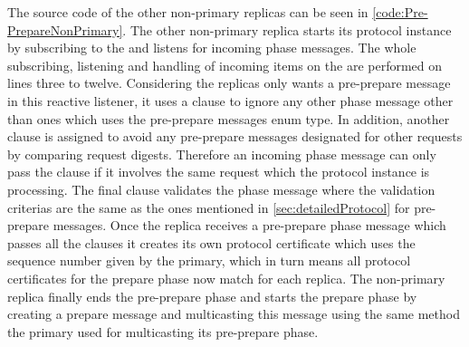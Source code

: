 
The source code of the other non-primary replicas can be seen in \autoref{code:Pre-PrepareNonPrimary}. The other non-primary replica starts its protocol instance by subscribing to the   and listens for incoming phase messages. The whole subscribing, listening and handling of incoming items on the  are performed on lines three to twelve. Considering the replicas only wants a pre-prepare message in this reactive listener, it uses a  clause to ignore any other phase message other than ones which uses the pre-prepare messages enum type. In addition, another  clause is assigned to avoid any pre-prepare messages designated for other requests by comparing request digests. Therefore an incoming phase message can only pass the  clause if it involves the same request which the protocol instance is processing. The final  clause validates the phase message where the validation criterias are the same as the ones mentioned in \autoref{sec:detailedProtocol} for pre-prepare messages. Once the replica receives a pre-prepare phase message which passes all the  clauses it creates its own protocol certificate which uses the sequence number given by the primary, which in turn means all protocol certificates for the prepare phase now match for each replica. The non-primary replica finally ends the pre-prepare phase and starts the prepare phase by creating a prepare message and multicasting this message using the same method the primary used for multicasting its pre-prepare phase.

